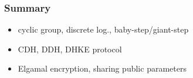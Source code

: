 \begin{frame}\frametitle{Summary}
\begin{itemize}
\item cyclic group, discrete log., baby-step/giant-step
\item CDH, DDH, DHKE protocol
\item Elgamal encryption, sharing public parameters
\end{itemize}
\end{frame}

